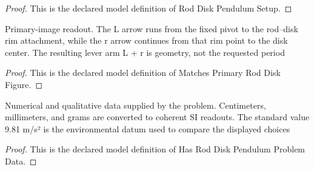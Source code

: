 \begin{proof}
  This is the declared model definition of Rod Disk Pendulum Setup.
\end{proof}
\begin{definition}
  \label{def:physics:phyx-mini-0262:phyxminiproblems-problemphyxmini0262-matchesprimaryroddiskfigure}
  Primary-image readout. The L arrow runs from the fixed pivot to the rod--disk rim attachment, while the r arrow continues from that rim point to the disk center. The resulting lever arm L + r is geometry, not the requested period
\end{definition}
\begin{proof}
  This is the declared model definition of Matches Primary Rod Disk Figure.
\end{proof}
\begin{definition}
  \label{def:physics:phyx-mini-0262:phyxminiproblems-problemphyxmini0262-hasroddiskpendulumproblemdata}
  Numerical and qualitative data supplied by the problem. Centimeters, millimeters, and grams are converted to coherent SI readouts. The standard value 9.81 m/s² is the environmental datum used to compare the displayed choices
\end{definition}
\begin{proof}
  This is the declared model definition of Has Rod Disk Pendulum Problem Data.
\end{proof}
